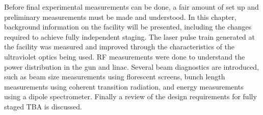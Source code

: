 \label{chp:exp}


Before final experimental measurements can be done, 
a fair amount of set up and preliminary measurements must be made and understood. 
In this chapter, background information on the facility will be presented, 
including the changes required  to achieve fully independent staging.
The laser pulse train generated at the facility was measured and improved 
through the characteristics of the ultraviolet optics being used. 
RF measurements were done to understand the power distribution in the gun and linac.
Several beam diagnostics are introduced, such as beam size measurements using 
florescent screens, bunch length measurements using coherent transition radiation, 
and energy measurements using a dipole spectrometer. 
Finally a review of the design requirements for fully staged TBA is discussed.

 \label{sec:facility}

